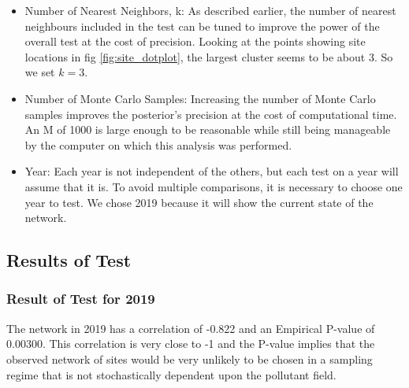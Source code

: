 \begin{itemize}
	\item Number of Nearest Neighbors, \gls{k}:
	As described earlier, the number of nearest neighbours included in the test can be tuned to improve the power of the overall test at the cost of precision.  Looking at the points showing site locations in fig \ref{fig:site_dotplot}, the largest cluster seems to be about 3.  So we set $k = 3$.  
	
	\item Number of Monte Carlo Samples:
	Increasing the number of Monte Carlo samples improves the posterior's precision at the cost of computational time.  An M of 1000 is large enough to be reasonable while still being manageable by the computer on which this analysis was performed.
	\item Year:
	Each year is not independent of the others, but each test on a year will assume that it is.  To avoid multiple comparisons, it is necessary to choose one year to test.  We chose 2019 because it will show the current state of the network.
	
\end{itemize}


\subsection{Results of Test}
\label{subsec:testresults}

\subsubsection*{Result of Test for 2019}
\label{subsubsec:test2019}


The network in 2019 has a correlation of -0.822 and an Empirical P-value of 0.00300. 
This correlation is very close to -1 and the P-value implies that the observed network of sites would be very unlikely to be chosen in a sampling regime that is not stochastically dependent upon the pollutant field.  


